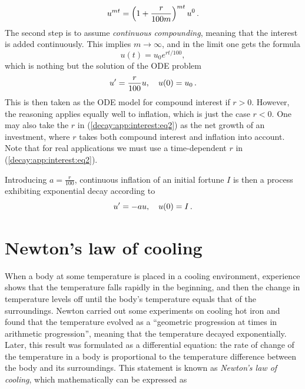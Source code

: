 \documentclass[%
oneside,                 %
final,                   %
10pt]{article}
\begin{document}
\[ u^{mt} = \left(1 + \frac{r}{100 m}\right)^{mt} u^0\tp  \]
The second step is to assume \emph{continuous compounding}, meaning that the
interest is added continuously. This implies $m\rightarrow\infty$, and
in the limit one gets the formula
\begin{equation}
u(t) = u_0e^{rt/100},
\end{equation}
which is nothing but the solution of the ODE problem
\begin{equation}
u^{\prime} = \frac{r}{100}u,\quad u(0)=u_0
\tp
\label{decay:app:interest:eq2}
\end{equation}
This is then taken as the ODE model for compound interest if $r>0$.
However, the reasoning applies equally well to inflation, which is
just the case $r < 0$.
One may also take the $r$ in (\ref{decay:app:interest:eq2})
as the net growth of an investment, where $r$ takes both compound interest
and inflation into account. Note that for real applications we must
use a time-dependent $r$ in (\ref{decay:app:interest:eq2}).


Introducing $a=\frac{r}{100}$, continuous inflation of an initial
fortune $I$ is then
a process exhibiting exponential decay according to
\[ u^{\prime} = -au,\quad u(0)=I\tp  \]

\section{Newton's law of cooling}
\label{decay:app:Newton:cooling}


When a body at some temperature is placed in a cooling environment,
experience shows that the temperature falls rapidly in the beginning,
and then the change in temperature levels off until the body's
temperature equals that of the surroundings. Newton carried out some
experiments on cooling hot iron and found that the temperature
evolved as a ``geometric progression at times in arithmetic progression'',
meaning that the temperature decayed exponentially.
Later, this result was formulated as a differential equation:
the rate of change of the temperature in a body is proportional to
the temperature difference between the body and its surroundings.
This statement is known as \emph{Newton's law of cooling}, which
mathematically can be expressed as
\end{document}

